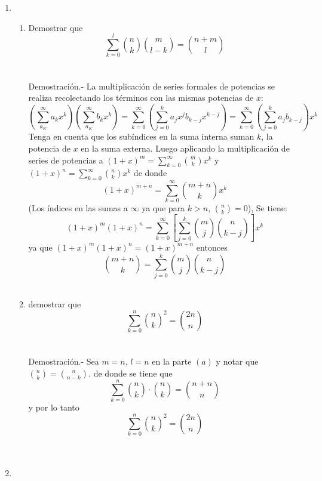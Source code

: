 \begin{enumerate}
      \item 
        \begin{enumerate}[\bfseries (a)]
        \item Demostrar que $$\displaystyle\sum_{k=0}^{l} {n \choose k} {m \choose l-k} = {n+m \choose l}$$\\\\
        Demostración.- \; La multiplicación de series formales de potencias se realiza recolectando los términos con las mismas potencias de $x$: 
        $$\left( \sum\limits_{a_K}^{\infty} a_k x^k \right) \left( \sum\limits_{a_K}^{\infty} b_k x^k \right) = \sum\limits_{k=0}^{\infty} \left(\sum\limits_{j=0}^{k} a_j x^j b_{k-j} x^{k-j}  \right) = \sum\limits_{k=0}^{\infty} \left(\sum\limits_{j=0}^{k} a_j  b_{k-j}   \right) x^k$$
        Tenga en cuenta que los subíndices en la suma interna suman $k$, la potencia de $x$ en la suma externa.
        Luego aplicando la multiplicación de series de potencias a $(1+x)^m = \sum\limits_{k=0}^{\infty} {m \choose k}x^k$ y $(1+x)^n = \sum\limits_{k=0}^{\infty} {n \choose k}x^k$ de donde $$(1+x)^{m+n} = \sum\limits_{k=0}^{\infty} {m+n \choose k }x^k$$
        (Los índices en las sumas a $\infty$ ya que para $k>n$, ${n  \choose k} =0$), Se tiene:
        $$(1+x)^m (1+x)^n = \sum\limits_{k=0}^{\infty} \left[ \sum\limits_{j=0}^{k} {m \choose j} {n \choose k-j} \right]x^k$$
        ya que $(1+x)^m (1+x)^n = (1+x)^{m+n}$ entonces $${m+n \choose k} = \sum\limits_{j=0}^{k} {m \choose j} {n \choose k-j}$$\\ 
        

        \item demostrar que $$\displaystyle\sum_{k=0}^{n} {n \choose k}^2 = {2n \choose n}$$\\\\
        Demostración.- \; Sea $m=n$, $l=n$ en la parte $(a)$ y notar que ${n \choose k} = {n \choose n-k}.$ de donde se tiene que $$ \sum\limits_{k=0}^{n} {n \choose k} \cdot  {n \choose k} = {n+n \choose n}$$ y por lo tanto $$\sum\limits_{k=0}^{n} {n \choose k}^2 = {2n \choose n}$$\\\\  
        
        \end{enumerate}

     \item \begin{enumerate}[\bfseries (a)] 


\end{enumerate}
\end{enumerate}
